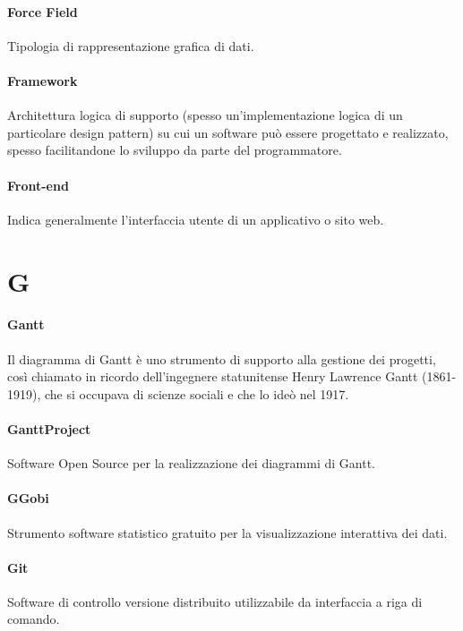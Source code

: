 \documentclass[]{article}
\begin{document}
	\paragraph*{Force Field}
	Tipologia di rappresentazione grafica di dati.

	\paragraph*{Framework}
	Architettura logica di supporto (spesso un'implementazione logica di un particolare design pattern) su cui un software può essere progettato e realizzato, spesso facilitandone lo sviluppo da parte del programmatore.

	\paragraph*{Front-end}
	Indica generalmente l'interfaccia utente di un applicativo o sito web.

	\newpage

	\section*{G}

	\paragraph*{Gantt}
	Il diagramma di Gantt è uno strumento di supporto alla gestione dei progetti, così chiamato in ricordo dell'ingegnere statunitense Henry Lawrence Gantt (1861-1919), che si occupava di scienze sociali e che lo ideò nel 1917.

	\paragraph*{GanttProject}
	Software Open Source per la realizzazione dei diagrammi di Gantt.

	\paragraph*{GGobi}
	Strumento software statistico gratuito per la visualizzazione interattiva dei dati.

	\paragraph*{Git}
	Software di controllo versione distribuito utilizzabile da interfaccia a riga di comando.
\end{document}
